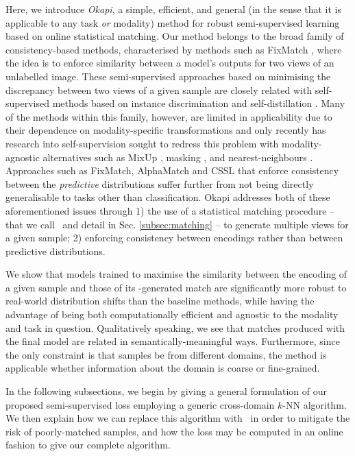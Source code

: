 Here, we introduce \emph{Okapi}, a simple, efficient, and general (in the sense that it is
applicable to any task \emph{or} modality) method for robust semi-supervised learning based on
online statistical matching. 
%
Our method belongs to the broad family of consistency-based methods, characterised by methods such
as FixMatch \citep{sohn2020fixmatch}, where the idea is to enforce similarity between a model's
outputs for two views of an unlabelled image. 
%
These semi-supervised approaches based on minimising the discrepancy between two views of a given
sample are closely related with self-supervised methods based on instance discrimination
\citep{chen2020simple} and self-distillation \citep{baevski2022data2vec,caron2021emerging,grill2020bootstrap}.
%
Many of the methods within this family, however, are limited in applicability due to their
dependence on modality-specific transformations and only recently has research into
self-supervision sought to redress this problem with modality-agnostic alternatives such as MixUp
\citep{verma2021towards}, masking \citep{baevski2022data2vec}, and nearest-neighbours
\citep{dwibedi2021little, koohpayegani2021mean, van2021revisiting}.
%
Approaches such as FixMatch, AlphaMatch \citep{gong2021alphamatch} and CSSL
\citep{lienen2021credal} that enforce consistency between the \emph{predictive} distributions
suffer further from not being directly generalisable to tasks other than classification.
%
Okapi addresses both of these aforementioned issues through 1) the use of a statistical matching
procedure -- that we call \CNN\ and detail in Sec. \ref{subsec:matching} -- to generate
multiple views for a given sample; 2) enforcing consistency between encodings rather than between
predictive distributions.

We show that models trained to maximise the similarity between the encoding of a given sample and
those of its \CNN-generated match are significantly more robust to real-world distribution shifts
than the baseline methods, while  having the advantage of being both computationally efficient
and agnostic to the modality and task in question.
%
Qualitatively speaking, we see that matches produced with the final model are related in
semantically-meaningful ways. 
%
Furthermore, since the only constraint is that samples be from different domains, the method is
applicable whether information about the domain is coarse or fine-grained.
%

In the following subsections, we begin by giving a general formulation of our proposed
semi-supervised loss employing a generic cross-domain $k$-NN algorithm. 
%
We then explain how we can replace this algorithm with \CNN\ in order to mitigate the risk of
poorly-matched samples, and how the loss may be computed in an online fashion to give our complete
algorithm.

